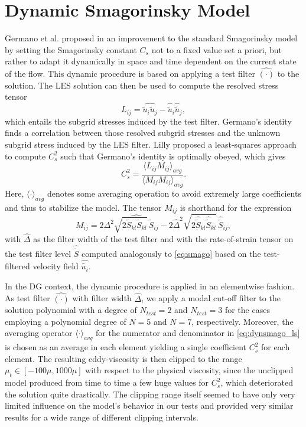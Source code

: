 \section{Dynamic Smagorinsky Model}
\label{app:dynsmago}

Germano et al. proposed in \cite{germano1991dynamic} an improvement to the standard Smagorinsky model by setting the Smagorinsky constant $C_s$ not to a fixed value set a priori, but rather to adapt it dynamically in space and time dependent on the current state of the flow.
This dynamic procedure is based on applying a test filter $\widehat{(\cdot)}$ to the solution.
The LES solution can then be used to compute the resolved stress tensor
\begin{equation}
  L_{ij} = \widehat{\widetilde{u}_i \widetilde{u}_j} - \widehat{\widetilde{u}}_i \widehat{\widetilde{u}}_j,
\end{equation}
which entails the subgrid stresses induced by the test filter.
Germano's identity finds a correlation between those resolved subgrid stresses and the unknown subgrid stress induced by the LES filter.
Lilly \cite{lilly1992proposed} proposed a least-squares approach to compute $C_s^2$ such that Germano's identity is optimally obeyed, which gives
\begin{equation}
  C_s^2 = \frac{\langle L_{ij}M_{ij}\rangle_{avg}}{\langle M_{ij}M_{ij} \rangle_{avg}}.
  \label{eq:dynsmago_ls}
\end{equation}
Here, $\langle\cdot\rangle_{avg}$ denotes some averaging operation to avoid extremely large coefficients and thus to stabilize the model.
The tensor $M_{ij}$ is shorthand for the expression
\begin{equation}
  M_{ij} = 2 \Delta^2 \widehat{\sqrt{2\tilde{S}_{kl}\tilde{S}_{kl}}\,\tilde{S}_{ij}}  - 2 \widehat{\Delta}^2 \sqrt{2\widehat{\tilde{S}}_{kl}\widehat{\tilde{S}}_{kl}}\, \widehat{\tilde{S}}_{ij},
\end{equation}
with $\widehat{\Delta}$ as the filter width of the test filter and with the rate-of-strain tensor on the test filter level $\widehat{\tilde{S}}$ computed analogously to \eqref{eq:smago} based on the test-filtered velocity field $\widehat{\tilde{u_i}}$.

In the DG context, the dynamic procedure is applied in an elementwise fashion.
As test filter $\widehat{(\cdot)}$ with filter width $\widehat{\Delta}$, we apply a modal cut-off filter to the solution polynomial with a degree of $N_{test}=2$ and $N_{test}=3$ for the cases employing a polynomial degree of $N=5$ and $N=7$, respectively.
Moreover, the averaging operator $\langle\cdot\rangle_{avg}$ for the numerator and denominator in \eqref{eq:dynsmago_ls} is chosen as an average in each element yielding a single coefficient $C_s^2$ for each element.
The resulting eddy-viscosity is then clipped to the range $\mu_t \in [-100\mu,1000\mu]$ with respect to the physical viscosity, since the unclipped model produced from time to time a few huge values for $C_s^2$, which deteriorated the solution quite drastically.
The clipping range itself seemed to have only very limited influence on the model's behavior in our tests and provided very similar results for a wide range of different clipping intervals.
